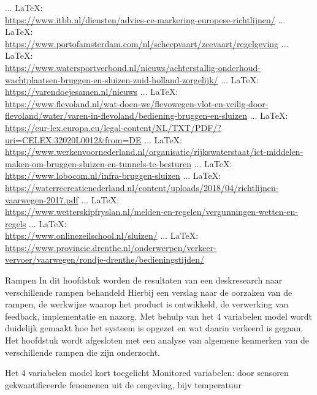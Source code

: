 \begin{thebibliography}{99}
{{{{ ... \LaTeX:\\ \url{https://www.itbb.nl/diensten/advies-ce-markering-europese-richtlijnen/}
 ... \LaTeX:\\ \url{https://www.portofamsterdam.com/nl/scheepvaart/zeevaart/regelgeving}
 ... \LaTeX:\\ \url{https://www.watersportverbond.nl/nieuws/achterstallig-onderhoud-wachtplaatsen-bruggen-en-sluizen-zuid-holland-zorgelijk/}
 ... \LaTeX:\\ \url{https://varendoejesamen.nl/nieuws}
 ... \LaTeX:\\ \url{https://www.flevoland.nl/wat-doen-we/flevowegen-vlot-en-veilig-door-flevoland/water/varen-in-flevoland/bediening-bruggen-en-sluizen}
 ... \LaTeX:\\ \url{https://eur-lex.europa.eu/legal-content/NL/TXT/PDF/?uri=CELEX:32020L0012&from=DE}
 ... \LaTeX:\\ \url{https://www.werkenvoornederland.nl/organisatie/rijkswaterstaat/ict-middelen-maken-om-bruggen-sluizen-en-tunnels-te-besturen}
 ... \LaTeX:\\ \url{https://www.lobocom.nl/infra-bruggen-sluizen}
 ... \LaTeX:\\ \url{https://waterrecreatienederland.nl/content/uploads/2018/04/richtlijnen-vaarwegen-2017.pdf}
 ... \LaTeX:\\ \url{https://www.wetterskipfryslan.nl/melden-en-regelen/vergunningen-wetten-en-regels}
 ... \LaTeX:\\ \url{https://www.onlinezeilschool.nl/sluizen/}
 ... \LaTeX:\\ \url{https://www.provincie.drenthe.nl/onderwerpen/verkeer-vervoer/vaarwegen/rondje-drenthe/bedieningstijden/}





Rampen
In dit hoofdstuk worden de resultaten van een deskresearch naar verschillende rampen behandeld
Hierbij een verslag naar de oorzaken van de rampen, de werkwijze waarop het product is ontwikkeld, de verwerking van feedback, implementatie en nazorg.
Met behulp van het 4 variabelen model wordt duidelijk gemaakt hoe het systeem is opgezet en wat daarin verkeerd is gegaan.
Het  hoofdstuk wordt afgesloten met een analyse van algemene kenmerken van de verschillende rampen die zijn onderzocht.


Het 4 variabelen model kort toegelicht
Monitored variabelen: door sensoren gekwantificeerde fenomenen uit de omgeving, bijv temperatuur

}}}}
\end{thebibliography}
